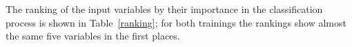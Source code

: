 
The ranking of the input variables by their importance in the classification process is shown in Table~\ref{ranking}; for both trainings the rankings show almost the same five variables in the first places.

